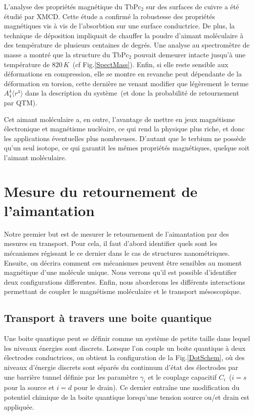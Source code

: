 L'analyse des propriétés magnétique du TbPc$_{2}$ sur des surfaces de cuivre a été étudié par XMCD. Cette étude a confirmé la robustesse des propriétés magnétiques vis à vis de l'absorbtion sur une surface conductrice. De plus, la technique de déposition impliquait de chauffer la poudre d'aimant moléculaire à des température de plusieurs centaines de degrés. Une analyse au spectromètre de masse a montré que la structure du TbPc$_{2}$ pouvait demeurer intacte jusqu'à une température de $820\,K$~(cf Fig.\ref{SpectMass}). Enfin, si elle reste sensible aux déformations en compression, elle se montre en revanche peut dépendante de la déformation en torsion, cette dernière ne venant modifier que légèrement le terme $A_4^4 \langle r^4 \rangle$ dans la description du système~(et donc la probabilité de retournement par QTM).

Cet aimant moléculaire a, en outre, l'avantage de mettre en jeux magnétisme électronique et magnétisme nucléaire, ce qui rend la physique plus riche, et donc les applications éventuelles plus nombreuses. D'autant que le terbium ne possède qu'un seul isotope, ce qui garantit les mêmes propriétés magnétiques, quelque soit l'aimant moléculaire.

\section{Mesure du retournement de l'aimantation}
Notre premier but est de mesurer le retournement de l'aimantation par des mesures en transport. Pour cela, il faut d'abord identifier quels sont les mécanismes régissant le ce dernier dans le cas de structures nanométriques. Ensuite, on décrira comment ces mécanismes peuvent \^etre sensibles au moment magnétique d'une molécule unique. Nous verrons qu'il est possible d’identifier deux configurations differentes. Enfin, nous aborderons les différents interactions permettant de coupler le magnétisme moléculaire et le transport mésoscopique.

\subsection{Transport à travers une boite quantique}
Une boite quantique peut se définir comme un système de petite taille dans lequel les niveaux énergies sont discrets. Lorsque l'on couple un boite quantique à deux électrodes conductrices, on obtient la configuration de la Fig.\ref{DotSchem}, où des niveaux d'énergie discrets sont séparés du continuum d'état des électrodes par une barrière tunnel définie par les paramètre $\gamma_i$ et le couplage capacitif $C_i$~($i=s$ pour la source et $i=d$ pour le drain). Ce dernier entraîne une modification du potentiel chimique de la boite quantique lorsqu'une tension source ou/et drain est appliquée.

